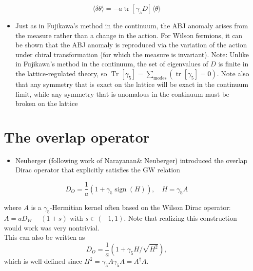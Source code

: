 \begin{equation}
\langle\delta \theta\rangle=-a\operatorname{tr}\left[\gamma_{5} D\right]\langle\theta\rangle
\end{equation}

\begin{itemize}
    \item Just as in Fujikawa's method in the continuum, the ABJ anomaly arises from the measure rather than a change in the action. For Wilson fermions, it can be shown that the ABJ anomaly is reproduced via the variation of the action under chiral transformation (for which the measure is invariant). Note: Unlike in Fujikawa's method in the continuum, the set of eigenvalues of $D$ is finite in the lattice-regulated theory, so $\operatorname{Tr}[\gamma_5] = \sum_\text{modes}(\operatorname{tr}[\gamma_5] = 0)$. Note also that any symmetry that is exact on the lattice will be exact in the continuum limit, while any symmetry that is anomalous in the continuum must be broken on the lattice
\end{itemize}

\section{The overlap operator}

\begin{itemize}
  \item Neuberger (following work of Narayanan\& Neuberger) introduced the overlap Dirac operator that explicitly satisfies the GW relation
\end{itemize}

\begin{equation}
D_{O}=\frac{1}{a}\left(1+\gamma_{5} \operatorname{sign}(H)\right), \quad H=\gamma_{5} A
\end{equation}

where \(A\) is a \(\gamma_{5}\)-Hermitian kernel often based on the Wilson Dirac operator: \(A=a D_{W}-(1+s)\) with $s \in (-1, 1)$. Note that realizing this construction would work was very nontrivial.\\
This can also be written as
\begin{equation}
    D_O = \frac{1}{a}\left(1 + \gamma_5 H / \sqrt{H^2}\right),
\end{equation}
which is well-defined since $H^2 = \gamma_5 A \gamma_5 A = A^\dagger A$.

